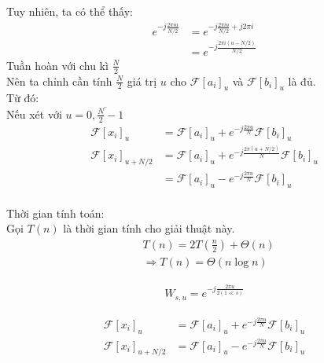 \documentclass[12pt]{report}
\begin{document}
\newpage
\noindent Tuy nhiên, ta có thể thấy:
\begin{align*}
    e^{-j\frac{2\pi i u}{N/2}} 
    &= e^{-j\frac{2\pi i u}{N/2} + j 2\pi i}  \\
    &= e^{-j\frac{2\pi i (u - N/2)}{N/2}}
\end{align*}
Tuần hoàn với chu kì $\frac{N}{2}$ \\
Nên ta chỉnh cần tính $\frac{N}{2}$ giá trị $u$ cho 
$\mathcal{F}[a_i]_u$ và $\mathcal{F}[b_i]_u$ là đủ. \\[1cm]

\noindent Từ đó: \\
Nếu xét với $u = \overline{0, \frac{N}{2} - 1}$
\begin{align*}
    \mathcal{F}[x_i]_u &= \mathcal{F}[a_i]_u 
    + e^{-j\frac{2\pi u}{N}} \mathcal{F}[b_i]_u \\
    \mathcal{F}[x_i]_{u + N/2} &= \mathcal{F}[a_i]_u 
    + e^{-j\frac{2\pi (u + N/2)}{N}} \mathcal{F}[b_i]_u \\
    &= \mathcal{F}[a_i]_u 
    - e^{-j\frac{2\pi u}{N}} \mathcal{F}[b_i]_u
\end{align*}\\[1cm]

\noindent Thời gian tính toán:  \\
Gọi $T(n)$ là thời gian tính cho giải thuật này.
\begin{align*}
    &T\left(n\right) = 2 T\left(\frac{n}{2}\right) 
    + \Theta \left(n\right) \\
    &\Rightarrow T(n) = \Theta \left( n \log n\right)
\end{align*}

\begin{align*}
    W_{s, u} = e^{-j\frac{2\pi u}{2 (1 \ll s)}}
\end{align*}

\begin{align*}
    \mathcal{F}[x_i]_u &= \mathcal{F}[a_i]_u 
    + e^{-j\frac{2\pi u}{N}} \mathcal{F}[b_i]_u \\
    \mathcal{F}[x_i]_{u + N/2} &= \mathcal{F}[a_i]_u 
    - e^{-j\frac{2\pi u}{N}} \mathcal{F}[b_i]_u
\end{align*}\\[1cm]
\end{document}
